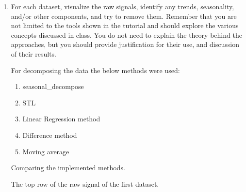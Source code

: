\documentclass[12pt]{article}
\begin{document}

\pagebreak

\begin{enumerate}



\item For each dataset, visualize the raw signals, identify any trends, seasonality, and/or other components, and try to remove them. Remember that you are not limited to the tools shown in the tutorial and should explore the various concepts discussed in class. You do not need to explain the theory behind the approaches, but you should provide justification for their use, and discussion of their results.



For decomposing the data the below methods were used:
    \begin{enumerate}
    \item seasonal\_decompose
    \item STL
    \item Linear Regression method
    \item Difference method
    \item Moving average
    \end{enumerate}

\begin{table}[H]
\centering
\caption{Comparing the implemented methods.
{\label{tab:Ass1_comparing_methods}}}

\end{table}

\begin{table}[]
 \centering
\caption{The top row of the raw signal of the first dataset.
{\label{tab:Ass1_D1_raw_signal}}}

\end{table}


\end{enumerate}
\end{document}
